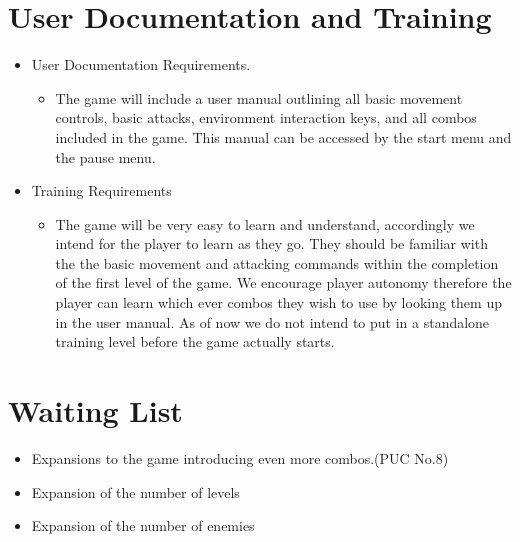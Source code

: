 \documentclass{article}
\begin{document}
	\section{User Documentation and Training}
	\begin{itemize}
		\item User Documentation Requirements.
		\begin{itemize}
			\item The game will include a user manual outlining all basic movement controls, basic attacks, environment interaction keys, and all combos included in the game. This manual can be accessed by the start menu and the pause menu.
		\end{itemize}
		\item Training Requirements
		\begin{itemize}
			\item The game will be very easy to learn and understand, accordingly we intend for the player to learn as they go. They should be familiar with the the basic movement and attacking commands within the completion of the first level of the game. We encourage player autonomy therefore the player can learn which ever combos they wish to use by looking them up in the user manual. As of now we do not intend to put in a standalone training level before the game actually starts.
		\end{itemize}
	\end{itemize}

	\section{Waiting List}
	\begin{itemize}
		\item Expansions to the game introducing even more combos.(PUC No.8)
		\item Expansion of the number of levels
		\item Expansion of the number of enemies
	\end{itemize}
\end{document}
